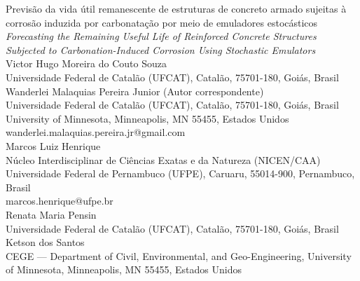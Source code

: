 \begin{center}
{\Huge Previs\~ao da vida \'util remanescente de estruturas de concreto armado sujeitas \`a corros\~ao induzida por carbonata\c{c}\~ao por meio de emuladores estoc\'asticos}
\\[1ex]
{\large\itshape Forecasting the Remaining Useful Life of Reinforced Concrete Structures Subjected to Carbonation-Induced Corrosion Using Stochastic Emulators}
\\[4ex]

{\large Victor Hugo Moreira do Couto Souza} \\
{\small
Universidade Federal de Catal\~ao (UFCAT), Catal\~ao, 75701-180, Goi\'as, Brasil
} \\[1.0em]

{\large Wanderlei Malaquias Pereira Junior \small(Autor correspondente)} \\
{\small
Universidade Federal de Catal\~ao (UFCAT), Catal\~ao, 75701-180, Goi\'as, Brasil \\
University of Minnesota, Minneapolis, MN 55455, Estados Unidos \\
wanderlei.malaquias.pereira.jr@gmail.com
} \\[1.0em]

{\large Marcos Luiz Henrique} \\
{\small
Núcleo Interdisciplinar de Ciências Exatas e da Natureza (NICEN/CAA)\\
Universidade Federal de Pernambuco (UFPE), Caruaru, 55014-900, Pernambuco, Brasil\\
marcos.henrique@ufpe.br
} \\[1.0em]

{\large Renata Maria Pensin} \\
{\small
Universidade Federal de Catal\~ao (UFCAT), Catal\~ao, 75701-180, Goi\'as, Brasil
} \\[1.0em]

{\large Ketson dos Santos} \\
{\small
CEGE --- Department of Civil, Environmental, and Geo-Engineering, University of Minnesota, Minneapolis, MN 55455, Estados Unidos
}
\end{center}

